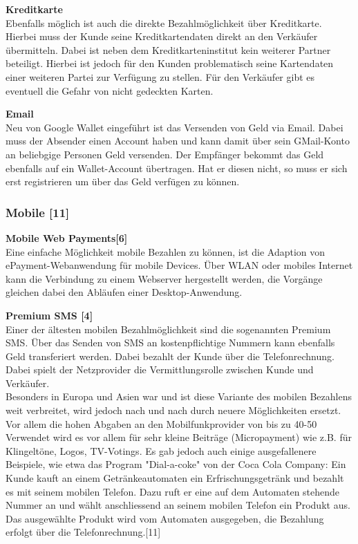 \textbf{Kreditkarte}\\
Ebenfalls möglich ist auch die direkte Bezahlmöglichkeit über Kreditkarte. Hierbei muss der Kunde seine Kreditkartendaten direkt an den Verkäufer übermitteln. Dabei ist neben dem Kreditkarteninstitut kein weiterer Partner beteiligt. Hierbei ist jedoch für den Kunden problematisch seine Kartendaten einer weiteren Partei zur Verfügung zu stellen. Für den Verkäufer gibt es eventuell die Gefahr von nicht gedeckten Karten.

\textbf{Email}\\
Neu von Google Wallet eingeführt ist das Versenden von Geld via Email. Dabei muss der Absender einen Account haben und kann damit über sein GMail-Konto an beliebgige Personen Geld versenden. Der Empfänger bekommt das Geld ebenfalls auf ein Wallet-Account übertragen. Hat er diesen nicht, so muss er sich erst registrieren um über das Geld verfügen zu können.

\subsubsection{ Mobile [11]}
\textbf{Mobile Web Payments[6]}\\
Eine einfache Möglichkeit mobile Bezahlen zu können, ist die Adaption von ePayment-Webanwendung für mobile Devices. Über WLAN oder mobiles Internet kann die Verbindung zu einem Webserver hergestellt werden, die Vorgänge gleichen dabei den Abläufen einer Desktop-Anwendung. 

\textbf{Premium SMS [4]}\\
Einer der ältesten mobilen Bezahlmöglichkeit sind die sogenannten Premium SMS. Über das Senden von SMS an kostenpflichtige Nummern kann ebenfalls Geld transferiert werden. Dabei bezahlt der Kunde über die Telefonrechnung. Dabei spielt der Netzprovider die Vermittlungsrolle zwischen Kunde und Verkäufer.\\
Besonders in Europa und Asien war und ist diese Variante des mobilen Bezahlens weit verbreitet, wird jedoch nach und nach durch neuere Möglichkeiten ersetzt. Vor allem die hohen Abgaben an den Mobilfunkprovider von bis zu 40-50%
Verwendet wird es vor allem für sehr kleine Beiträge (Micropayment) wie z.B. für Klingeltöne, Logos, TV-Votings. Es gab jedoch auch einige ausgefallenere Beispiele, wie etwa das Program "Dial-a-coke" von der Coca Cola Company: Ein Kunde kauft an einem Getränkeautomaten ein Erfrischungsgetränk und bezahlt es mit seinem mobilen Telefon. Dazu ruft er eine auf dem Automaten stehende Nummer an und wählt anschliessend an seinem mobilen Telefon ein Produkt aus. Das ausgewählte Produkt wird vom Automaten ausgegeben, die Bezahlung erfolgt über die Telefonrechnung.[11]
 

